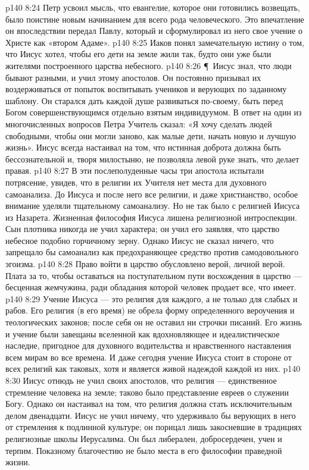 \vs p140 8:24 Петр усвоил мысль, что евангелие, которое они готовились возвещать, было поистине новым начинанием для всего рода человеческого. Это впечатление он впоследствии передал Павлу, который и сформулировал из него свое учение о Христе как «втором Адаме».
\vs p140 8:25 Иаков понял замечательную истину о том, что Иисус хотел, чтобы его дети на земле жили так, будто они уже были жителями построенного царства небесного.
\vs p140 8:26 \P\ Иисус знал, что люди бывают разными, и учил этому апостолов. Он постоянно призывал их воздерживаться от попыток воспитывать учеников и верующих по заданному шаблону. Он старался дать каждой душе развиваться по\hyp{}своему, быть перед Богом совершенствующимся отдельно взятым индивидуумом. В ответ на один из многочисленных вопросов Петра Учитель сказал: «Я хочу сделать людей свободными, чтобы они могли заново, как малые дети, начать новую и лучшую жизнь». Иисус всегда настаивал на том, что истинная доброта должна быть бессознательной и, творя милостыню, не позволяла левой руке знать, что делает правая.
\vs p140 8:27 В эти послеполуденные часы три апостола испытали потрясение, увидев, что в религии их Учителя нет места для духовного самоанализа. До Иисуса и после него все религии, и даже христианство, особое внимание уделяли тщательному самоанализу. Но не так было с религией Иисуса из Назарета. Жизненная философия Иисуса лишена религиозной интроспекции. Сын плотника никогда не учил  характера; он учил его  заявляя, что царство небесное подобно горчичному зерну. Однако Иисус не сказал ничего, что запрещало бы самоанализ как предохраняющее средство против самодовольного эгоизма.
\vs p140 8:28 Право войти в царство обусловлено верой, личной верой. Плата за то, чтобы оставаться на поступательном пути восхождения в царство --- бесценная жемчужина, ради обладания которой человек продает все, что имеет.
\vs p140 8:29 Учение Иисуса --- это религия для каждого, а не только для слабых и рабов. Его религия (в его время) не обрела форму определенного вероучения и теологических законов; после себя он не оставил ни строчки писаний. Его жизнь и учение были завещаны вселенной как вдохновляющее и идеалистическое наследие, пригодное для духовного водительства и нравственного наставления всем мирам во все времена. И даже сегодня учение Иисуса стоит в стороне от всех религий как таковых, хотя и является живой надеждой каждой из них.
\vs p140 8:30 Иисус отнюдь не учил своих апостолов, что религия --- единственное стремление человека на земле; таково было представление евреев о служении Богу. Однако он настаивал на том, что религия должна стать исключительным делом двенадцати. Иисус не учил ничему, что удерживало бы верующих в него от стремления к подлинной культуре; он порицал лишь закосневшие в традициях религиозные школы Иерусалима. Он был либерален, добросердечен, учен и терпим. Показному благочестию не было места в его философии праведной жизни.
